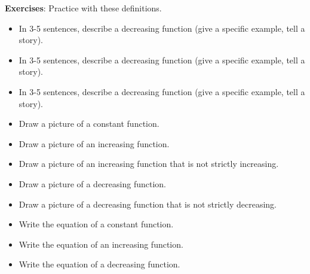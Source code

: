 \documentclass{article}
\theoremstyle{plain}
\theoremstyle{box}
\begin{document}
\textbf{Exercises}: Practice with these definitions.
\begin{itemize}
\item In 3-5 sentences, describe a decreasing function (give a specific example, tell a story).
\item In 3-5 sentences, describe a decreasing function (give a specific example, tell a story).
\item In 3-5 sentences, describe a decreasing function (give a specific example, tell a story).
\item Draw a picture of a constant function.
\item Draw a picture of an increasing function.
\item Draw a picture of an increasing function that is not strictly increasing.
\item Draw a picture of a decreasing function.
\item Draw a picture of a decreasing function that is not strictly decreasing.
\item Write the equation of a constant function.
\item Write the equation of an increasing function.
\item Write the equation of a decreasing function.
\end{itemize}


 
\end{document}
